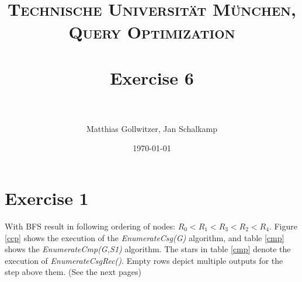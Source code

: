 \documentclass[paper=a4, fontsize=11pt]{scrartcl} %
\title{	
\normalfont \normalsize 
\textsc{Technische Universit\"at M\"unchen, Query Optimization} \\ [25pt] %
\horrule{0.5pt} \\[0.4cm] %
\huge Exercise 6 \\ %
\horrule{2pt} \\[0.5cm] %
}
\author{Matthias Gollwitzer, Jan Schalkamp} %
\date{\normalsize\today} %
\numberwithin{equation}{section} %
\numberwithin{figure}{section} %
\numberwithin{table}{section} %
\begin{document}
\lstset{language=SQL}
\maketitle %


\section{Exercise 1}
With BFS result in following ordering of nodes: $R_0 < R_1 < R_3 < R_2 < R_4$. Figure \ref{ccp} shows the execution of the \textit{EnumerateCsg(G)} algorithm, and table \ref{cmp} shows the \textit{EnumerateCmp(G,S1)} algorithm. The stars in table \ref{cmp} denote the execution of \textit{EnumerateCsgRec()}. Empty rows depict multiple outputs for the step above them. (See the next pages)
\end{document}
